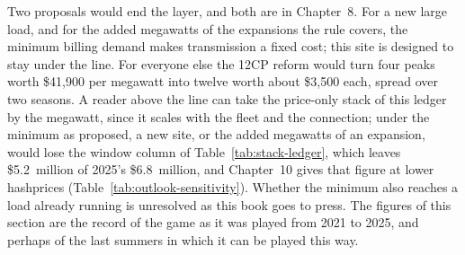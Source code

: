 Two proposals would end the layer, and both are in Chapter~8. For a new large load, and for the added megawatts of the expansions the rule covers, the minimum billing demand makes transmission a fixed cost; this site is designed to stay under the line. For everyone else the 12CP reform would turn four peaks worth \$41,900 per megawatt into twelve worth about \$3,500 each, spread over two seasons. %
A reader above the line can take the price-only stack of this ledger by the megawatt, since it scales with the fleet and the connection; under the minimum as proposed, a new site, or the added megawatts of an expansion, would lose the window column of Table~\ref{tab:stack-ledger}, which leaves \$5.2~million of 2025's \$6.8~million, and Chapter~10 gives that figure at lower hashprices (Table~\ref{tab:outlook-sensitivity}). Whether the minimum also reaches a load already running is unresolved as this book goes to press. %
The figures of this section are the record of the game as it was played from 2021 to 2025, and perhaps of the last summers in which it can be played this way.

